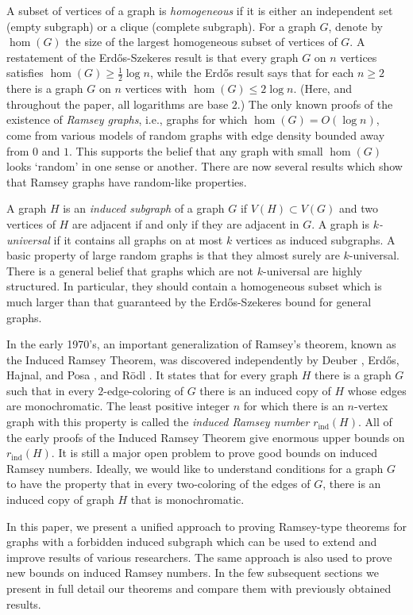 \documentclass[11pt]{article}
\begin{document}
A subset of vertices of a graph is {\it homogeneous} if it is either
an independent set (empty subgraph) or a clique (complete subgraph).
For a graph $G$, denote by $\hom(G)$ the size of the largest
homogeneous subset of vertices of $G$. A restatement of the
Erd\H{o}s-Szekeres result is that every graph $G$ on $n$ vertices
satisfies $\hom(G) \geq \frac{1}{2}\log n$, while the Erd\H{o}s
result says that for each $n\geq 2$ there is a graph $G$ on $n$
vertices with $\hom(G) \leq 2\log n$. (Here, and throughout the
paper, all logarithms are base $2$.) The only known proofs of the
existence of {\it Ramsey graphs}, i.e., graphs for which
$\hom(G)=O(\log n)$, come from various models of random graphs with
edge density bounded away from $0$ and $1$. This supports the belief
that any graph with small $\hom(G)$ looks `random' in one sense or
another. There are now several results which show that Ramsey graphs
have random-like properties.

A graph $H$ is an {\it induced subgraph} of a graph $G$ if $V(H)
\subset V(G)$ and two vertices of $H$ are adjacent if and only if
they are adjacent in $G$. A graph is {\it $k$-universal} if it
contains all graphs on at most $k$ vertices as induced subgraphs. A
basic property of large random graphs is that they almost surely are
$k$-universal. There is a general belief that graphs which are not
$k$-universal are highly structured. In particular, they should
contain a homogeneous subset which is much larger than that
guaranteed by the Erd\H{o}s-Szekeres bound for general graphs.

In the early 1970's, an important generalization of Ramsey's
theorem, known as the Induced Ramsey Theorem, was discovered
independently by Deuber \cite{De}, Erd\H{o}s, Hajnal, and Posa
\cite{ErHaPo}, and R\"odl \cite{Ro1}. It states that for every graph
$H$ there is a graph $G$ such that in every $2$-edge-coloring of $G$ there is
an induced copy of $H$ whose edges are monochromatic. The least positive integer
$n$ for which there is an $n$-vertex graph with this property is called the {\it induced
Ramsey number} $r_{\textrm{ind}}(H)$. All of the early proofs of the Induced
Ramsey Theorem give enormous upper bounds on $r_{\textrm{ind}}(H)$.
It is still a major open problem to prove good bounds on induced
Ramsey numbers. Ideally, we would like to understand conditions for
a graph $G$ to have the property that in every two-coloring of the
edges of $G$, there is an induced copy of graph $H$ that is
monochromatic.

In this paper, we present a unified approach to proving Ramsey-type
theorems for graphs with a forbidden induced subgraph which can be
used to extend and improve results of various researchers. The same
approach is also used to prove new bounds on induced Ramsey numbers.
In the few subsequent sections we present in full detail our
theorems and compare them with previously obtained results.
\end{document}
